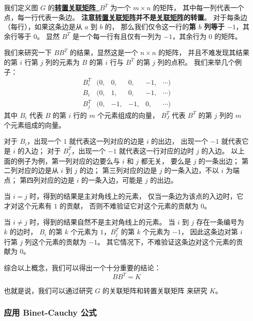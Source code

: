 \documentclass[UTF8]{article}
\begin{document}
	我们定义图 $G$ 的\textbf{\uline{转置关联矩阵~$B^T$}} 为一个 $m \times n$ 的矩阵，
	其中每一列代表一个点，每一行代表一条边。
	\textbf{注意\uline{转置关联矩阵}并不是\uline{关联矩阵}的转置}。
	对于每条边（每行），如果这条边是从 $a$ 到 $b$ 的，
	那么我们仅令这一行的\textbf{第 $b$ 列等于 $-1$}，其余行等于 $0$。
	显然 $B^T$ 是一个每一行有且仅有一列为 $-1$，其余行为 $0$ 的矩阵。

	我们来研究一下 $B B^T$ 的结果，显然这是一个 $n \times n$ 的矩阵，
	并且不难发现其结果的第 $i$ 行第 $j$ 列的元素为
	$B$ 的第 $i$ 行与 $B^T$ 的第 $j$ 列的点积。
	我们来举几个例子：
	\begin{equation*}
		\begin{matrix}
			B^T_i& (0,& 0,& 0,& -1,& \cdots)
			\\
			B_i& (0,& 1,& 0,& -1,& \cdots)
			\\
			B^T_j& (0,& -1,& -1,& 0,& \cdots)
		\end{matrix}
	\end{equation*}
	其中 $B_i$ 代表 $B$ 的第 $i$ 行的 $m$ 个元素组成的向量，
	$B^T_J$ 代表 $B^T$ 的第 $j$ 列的 $m$ 个元素组成的向量。

	对于 $B_i$，出现一个 $1$ 就代表这一列对应的边是 $i$ 的出边，
	出现一个 $-1$ 就代表它是 $i$ 的入边；
	对于 $B^T_j$，出现一个 $-1$ 就代表这一行对应的边时 $j$ 的入边。
	以上面的例子为例，第一列对应的边要么与 $i$ 和 $j$ 都无关，
	要么是 $j$ 的一条出边；
	第二列对应的边是从 $i$ 到 $j$ 的边；
	第三列对应的边是 $j$ 的一条入边，不以 $i$ 为端点；
	第四列对应的边是 $i$ 的一条入边，可能是 $j$ 的出边。

	当 $i = j$ 时，得到的结果是主对角线上的元素，
	仅当一条边为该点的入边时，它才对这个元素有 $1$ 的贡献，
	否则不难验证它对这个元素的贡献为 $0$。

	当 $i \ne j$ 时，得到的结果自然不是主对角线上的元素。
	当 $i$ 到 $j$ 存在一条编号为 $k$ 的边时，
	$B_i$ 的第 $k$ 个元素为 $1$，$B^T_j$ 的第 $k$ 个元素为 $-1$，
	因此这条边对第 $i$ 行第 $j$ 列这个元素的贡献为 $-1$。
	其它情况下，不难验证这条边对这个元素的贡献为 $0$。
	

	\bigskip

	综合以上概念，我们可以得出一个十分重要的结论：
	$$
	B B^T = K
	$$

	也就是说，我们可以通过研究 $G$ 的关联矩阵和转置关联矩阵
	来研究 $K$。

	\subsubsection{应用 Binet-Cauchy 公式}
\end{document}
